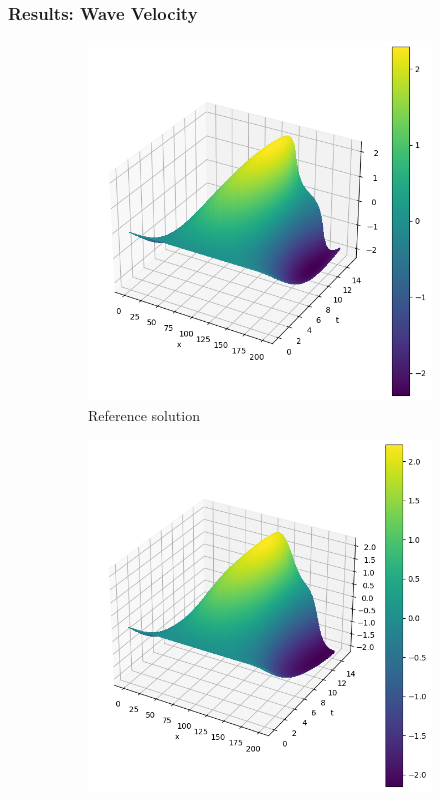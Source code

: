\begin{frame}
    \frametitle{Results: Wave Velocity}

    \begin{figure}
        \centering
        \begin{subfigure}[b]{0.45\textwidth}
            \centering
            \includegraphics[width=\textwidth]{images/homogeneous_pseudospectral_swe_velocity.png}
            \caption{Reference solution}
            \label{fig:10_homogeneous_pseudospectral_swe_velocity}
        \end{subfigure}
        \hfill
        \begin{subfigure}[b]{0.45\textwidth}
            \centering
            \includegraphics[width=\textwidth]{images/homogeneous_pinn_swe_velocity.png}

\end{subfigure}
\end{figure}
\end{frame}
